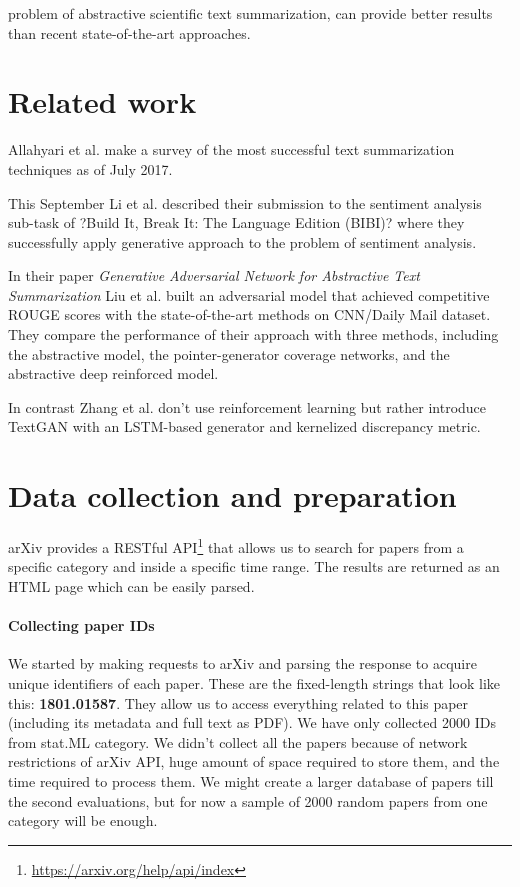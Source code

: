\documentclass[sigplan]{acmart}
\begin{document}
problem of abstractive scientific text summarization, can provide better results than recent state-of-the-art approaches. 

\section{Related work}

Allahyari et al.\cite{allahyari-17} make a survey of the most successful text summarization techniques as of July 2017.

This September Li et al. \cite{li-cohn-17} described their submission to the sentiment analysis sub-task of ?Build It, Break It: The Language Edition (BIBI)? where they successfully apply generative approach to the problem of sentiment analysis.

In their paper \textit{Generative Adversarial Network for Abstractive Text Summarization} Liu et al.\cite{liu-17} built an adversarial model that achieved competitive ROUGE scores with the state-of-the-art methods on CNN/Daily Mail dataset. They compare the performance of their approach with three methods, including the abstractive model, the pointer-generator coverage networks, and the abstractive deep reinforced model.

In contrast Zhang et al.\cite{zhang-17} don't use reinforcement learning but rather introduce TextGAN with an LSTM-based generator and kernelized discrepancy metric.



\section{Data collection and preparation}

arXiv provides a RESTful API\footnote{\url{https://arxiv.org/help/api/index}} that allows us to search for papers from a specific category and inside a specific time range. The results are returned as an HTML page which can be easily parsed.

\paragraph{Collecting paper IDs} We started by making requests to arXiv and parsing the response to acquire unique identifiers of each paper. These are the fixed-length strings that look like this: \textbf{1801.01587}. They allow us to access everything related to this paper (including its metadata and full text as PDF). We have only collected 2000 IDs from stat.ML category. We didn't collect all the papers because of network restrictions of arXiv API, huge amount of space required to store them, and the time required to process them. We might create a larger database of papers till the second evaluations, but for now a sample of 2000 random papers from one category will be enough.
\end{document}
